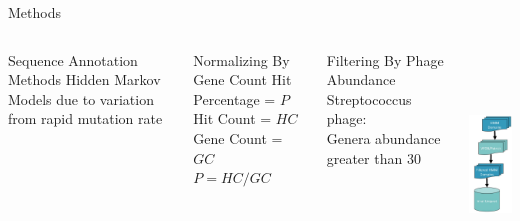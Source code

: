 \documentclass[11pt, xcolor=table]{beamer}
\begin{document}
	\begin{frame}{Methods}
	\begin{columns}
	\begin{block}{Sequence Annotation Methods}
	Hidden Markov Models due to variation \\ from rapid mutation rate
	\end{block}
	
	\begin{block}{Normalizing By Gene Count}
	Hit Percentage = $P$ \\
	Hit Count = $HC$ \\
	Gene Count = $GC$ \\
	\vspace{0.3cm}
	\hspace{1.5cm}	
	$P = {HC}/{GC}$
	\end{block}
	
	\begin{block}{Filtering By Phage Abundance}
	\alert{Streptococcus} phage: \\
	Genera abundance greater than 30
	\end{block}
	
	\hspace{-2cm}
	\includegraphics[height=6cm, width=3cm]{Pipeline.png}

	\end{columns}
	\end{frame}
	
\end{document}
